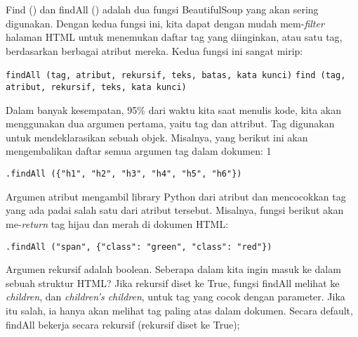 Find () dan findAll () adalah dua fungsi BeautifulSoup yang akan sering digunakan. Dengan kedua fungsi ini, kita dapat dengan mudah mem-\textit{filter} halaman HTML untuk menemukan daftar tag yang diinginkan, atau satu tag, berdasarkan berbagai atribut mereka. Kedua fungsi ini sangat mirip:

\verb|findAll (tag, atribut, rekursif, teks, batas, kata kunci)|
\verb|find (tag, atribut, rekursif, teks, kata kunci)|

Dalam banyak kesempatan, 95\% dari waktu kita saat menulis kode, kita akan menggunakan dua argumen pertama, yaitu tag dan attribut. Tag digunakan untuk mendeklarasikan sebuah objek.  Misalnya, yang berikut ini akan mengembalikan daftar semua argumen tag dalam dokumen: 1

\verb|.findAll ({"h1", "h2", "h3", "h4", "h5", "h6"})|

Argumen atribut mengambil library Python dari atribut dan mencocokkan tag yang ada padai salah satu dari atribut tersebut. Misalnya, fungsi berikut akan me-\textit{return} tag hijau dan merah di dokumen HTML:

\verb|.findAll ("span", {"class": "green", "class": "red"})|

Argumen rekursif adalah boolean. Seberapa dalam kita ingin masuk ke dalam sebuah struktur HTML? Jika rekursif diset ke True, fungsi findAll melihat ke \textit{children}, dan \textit{children’s children}, untuk tag yang cocok dengan parameter. Jika itu salah, ia hanya akan melihat tag paling atas dalam dokumen. Secara default, findAll bekerja secara rekursif (rekursif diset ke True);
